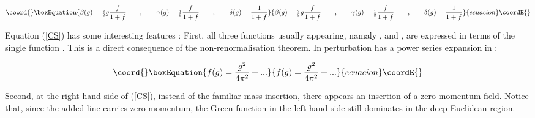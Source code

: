 \documentclass[a4paper,11pt]{article}
\begin{document}
\begin{equation}\coord{}\boxEquation{
\label{CS1}
\beta (g) = {\scriptstyle {\frac{3}{2}}} g \frac{f}{1+f} \qquad , 
\qquad  \gamma (g) = {\scriptstyle {\frac{1}{2}}} \frac{f}{1+f} \qquad , 
\qquad \delta (g) = \frac{1}{1+f}
}{
\beta (g) = {\scriptstyle {\frac{3}{2}}} g \frac{f}{1+f} \qquad , 
\qquad  \gamma (g) = {\scriptstyle {\frac{1}{2}}} \frac{f}{1+f} \qquad , 
\qquad \delta (g) = \frac{1}{1+f}
}{ecuacion}\coordE{}\end{equation}

Equation (\ref{CS}) has some interesting features \cite{FIZ} : First, all three 
functions usually appearing, namaly \myHighlight{$\beta$}\coordHE{}, \myHighlight{$\gamma$}\coordHE{} and \myHighlight{$\delta$}\coordHE{}, are expressed 
in terms of the single function \coordHE{}. This is a direct consequence of the 
non-renormalisation theorem. In perturbation \coordHE{} has a power series expansion in \coordHE{}:

\begin{equation}\coord{}\boxEquation{
\label{CS2}
f(g) = \frac{g^2}{4 \pi^2} +...
}{
f(g) = \frac{g^2}{4 \pi^2} +...
}{ecuacion}\coordE{}\end{equation}

Second, at the right hand side of (\ref{CS}), instead of the familiar mass insertion, 
there appears an insertion of a zero momentum \coordHE{} field. Notice that, since the 
added line carries zero momentum, the Green function in the left hand side still 
dominates in the deep Euclidean region.
\end{document}
